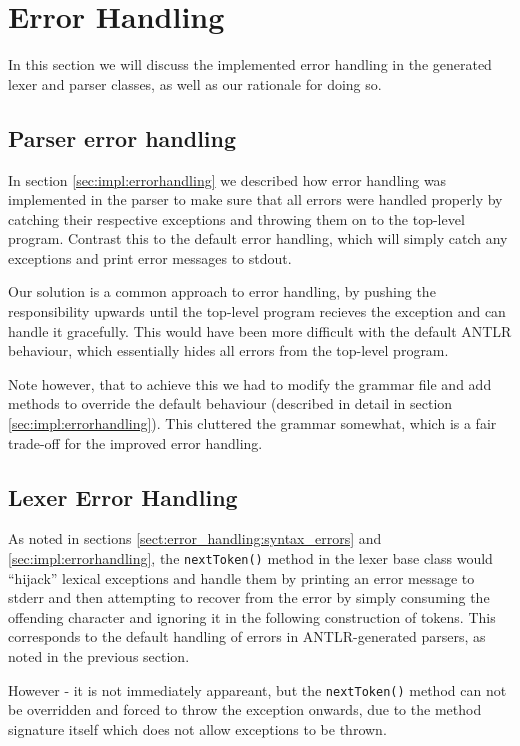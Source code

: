 \section{Error Handling}
\label{sect:discussion:error_handling}
In this section we will discuss the implemented error handling in the generated
lexer and parser classes, as well as our rationale for doing so. 

\subsection{Parser error handling}
In section \ref{sec:impl:errorhandling} we described how error handling was
implemented in the parser to make sure that all errors were handled properly by
catching their respective exceptions and throwing them on to the top-level
program. Contrast this to the default error handling, which will simply catch
any exceptions and print error messages to stdout.

Our solution is a common approach to error handling, by pushing the
responsibility upwards until the top-level program recieves the exception and
can handle it gracefully. This would have been more difficult with the default
ANTLR behaviour, which essentially hides all errors from the top-level program.

Note however, that to achieve this we had to modify the grammar file and add
methods to override the default behaviour (described in detail in section
\ref{sec:impl:errorhandling}). This cluttered the grammar somewhat, which is a
fair trade-off for the improved error handling.

\subsection{Lexer Error Handling}
\label{sect:future_work:lexer_error_handling} %
As noted in sections \ref{sect:error_handling:syntax_errors} and
\ref{sec:impl:errorhandling}, the \verb!nextToken()! method in the lexer base class
would ``hijack'' lexical exceptions and handle them by printing an error message
to stderr and then attempting to recover from the error by simply consuming the
offending character and ignoring it in the following construction of tokens.
This corresponds to the default handling of errors in ANTLR-generated parsers,
as noted in the previous section.

However - it is not immediately appareant, but the \verb!nextToken()! method can
not be overridden and forced to throw the exception onwards, due to the method
signature itself which does not allow exceptions to be thrown. 

